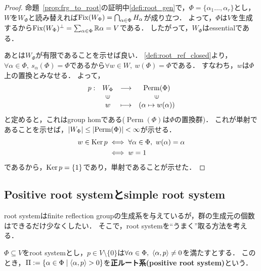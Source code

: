 \begin{proof}
  命題~\ref{prop:frg_to_root}の証明中\ref{defi:root_gen}で，$\Phi = \{\alpha_1 \ldots, \alpha_r\}$とし，$W$を$W_\Phi$と読み替えれば$\operatorname{Fix}(W_\Phi) = \bigcap_{\alpha \in \Phi} H_\alpha$が成り立つ．
  よって，$\Phi$は$V$を生成するから$\operatorname{Fix}(W_\Phi)^\perp = \sum_{\alpha \in \Phi} \mathbb{R}\alpha = V$である．
  したがって，$W_\Phi$はessentialである．

  あとは$W_\Phi$が有限であることを示せば良い．
  \ref{defi:root_ref_closed}より，$\forall \alpha \in \Phi,\ s_\alpha(\Phi) = \Phi$であるから$\forall w \in W,\ w(\Phi) = \Phi$である．
  すなわち，$w$は$\Phi$上の置換とみなせる．
  よって，
  \begin{equation}
    \begin{array}{rccc}
    p:&W_\Phi & \longrightarrow & \operatorname{Perm}(\Phi) \\
    &\rotatebox[origin=c]{90}{$\in$} & & \rotatebox[origin=c]{90}{$\in$} \\
    &w & \longmapsto & (\alpha \mapsto w(\alpha))
    \end{array}
  \end{equation}
  と定めると，これはgroup homである($\operatorname{Perm}(\Phi)$は$\Phi$の置換群)．
  これが単射であることを示せば，$\left| W_\Phi \right| \le \left| \operatorname{Perm}(\Phi) \right| < \infty$が示せる．
  \begin{align}
    w \in \operatorname{Ker} p
    &\iff \forall \alpha \in \Phi,\ w(\alpha) = \alpha\\
    &\iff w = 1
  \end{align}
  であるから，$\operatorname{Ker} p = \{1\}$であり，単射であることが示せた．
\end{proof}

\subsection{Positive root systemとsimple root system}


root systemはfinite reflection groupの生成系を与えているが，群の生成元の個数はできるだけ少なくしたい．
そこで，root systemを``うまく''取る方法を考える．

\begin{definition}
  $\Phi \subseteq V$をroot systemとし，$p \in V \setminus \{0\}$は$\forall \alpha \in \Phi,\ \left\langle \alpha, p \right\rangle \ne 0$を満たすとする．
  このとき，$\Pi := \left\lbrace \alpha \in \Phi \mathrel{} \middle| \mathrel{} \left\langle \alpha, p \right\rangle > 0 \right\rbrace$を\textbf{正ルート系(positive root system)}という．
\end{definition}


